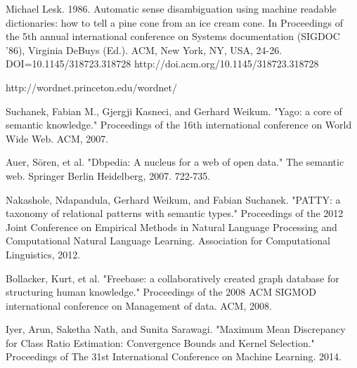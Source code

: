 \begin{thebibliography}{9}
 \label{lesk}
Michael Lesk. 1986. Automatic sense disambiguation using machine readable dictionaries: how to tell a pine cone from an ice cream cone. In Proceedings of the 5th annual international conference on Systems documentation (SIGDOC '86), Virginia DeBuys (Ed.). ACM, New York, NY, USA, 24-26. DOI=10.1145/318723.318728 http://doi.acm.org/10.1145/318723.318728

 \label{wordnet}
http://wordnet.princeton.edu/wordnet/

 \label{yago}
Suchanek, Fabian M., Gjergji Kasneci, and Gerhard Weikum. "Yago: a core of semantic knowledge." Proceedings of the 16th international conference on World Wide Web. ACM, 2007.

 \label{dbpedia}
Auer, Sören, et al. "Dbpedia: A nucleus for a web of open data." The semantic web. Springer Berlin Heidelberg, 2007. 722-735.

 \label{patty}
Nakashole, Ndapandula, Gerhard Weikum, and Fabian Suchanek. "PATTY: a taxonomy of relational patterns with semantic types." Proceedings of the 2012 Joint Conference on Empirical Methods in Natural Language Processing and Computational Natural Language Learning. Association for Computational Linguistics, 2012.

 \label{freebase}
Bollacker, Kurt, et al. "Freebase: a collaboratively created graph database for structuring human knowledge." Proceedings of the 2008 ACM SIGMOD international conference on Management of data. ACM, 2008.

 \label{mmd}
Iyer, Arun, Saketha Nath, and Sunita Sarawagi. "Maximum Mean Discrepancy for Class Ratio Estimation: Convergence Bounds and Kernel Selection." Proceedings of The 31st International Conference on Machine Learning. 2014.
\end{thebibliography}